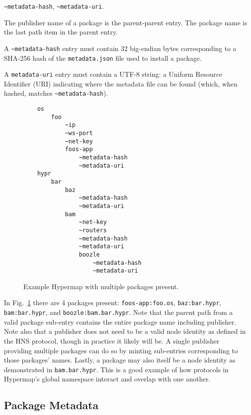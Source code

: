 \documentclass[runningheads]{llncs}
\begin{document}
\verb|~metadata-hash|, \verb|~metadata-uri|.

The publisher name of a package is the parent-parent entry.
The package name is the last path item in the parent entry.

A \verb|~metadata-hash| entry must contain 32 big-endian bytes corresponding to a SHA-256 hash of the \verb|metadata.json| file used to install a package.

A \verb|metadata-uri| entry must contain a UTF-8 string: a Uniform Resource Identifier (URI) indicating where the metadata file can be found (which, when hashed, matches \verb|~metadata-hash|).

\begin{figure}[H]
    \centering
    \begin{verbatim}
    os
        foo
            ~ip
            ~ws-port
            ~net-key
            foos-app
                ~metadata-hash
                ~metadata-uri
    hypr
        bar
            baz
                ~metadata-hash
                ~metadata-uri
            bam
                ~net-key
                ~routers
                ~metadata-hash
                ~metadata-uri
                boozle
                    ~metadata-hash
                    ~metadata-uri
    \end{verbatim}
    \caption{Example Hypermap with multiple packages present.}
    \label{fig:example hypermap with packages}
\end{figure}

In Fig.~\ref{fig:example hypermap with packages} there are 4 packages present: \verb|foos-app:foo.os|, \verb|baz:bar.hypr|, \verb|bam:bar.hypr|, and \verb|boozle:bam.bar.hypr|.
Note that the parent path from a valid package sub-entry contains the entire package name including publisher.
Note also that a publisher does not need to be a valid node identity as defined in the HNS protocol, though in practice it likely will be.
A single publisher providing multiple packages can do so by minting sub-entries corresponding to those packages' names.
Lastly, a package may also itself be a node identity as demonstrated in \verb|bam.bar.hypr|.
This is a good example of how protocols in Hypermap's global namespace interact and overlap with one another.

\subsection{Package Metadata}
\label{sec:packagemanagermetadata}
\end{document}
